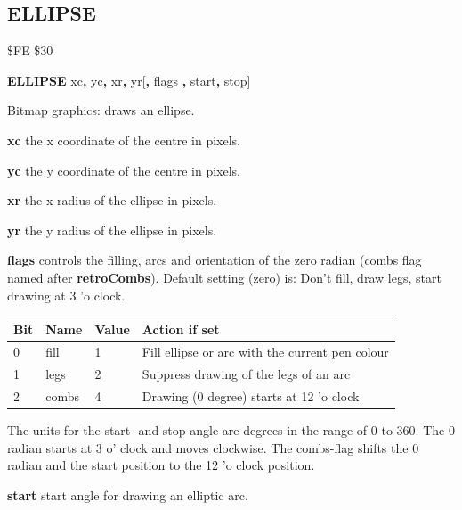 \subsection{ELLIPSE}
\begin{description}[leftmargin=2cm,style=nextline]
\item [Token:]    \$FE \$30

\item [Format:]   {\bf ELLIPSE} xc{\bf,} yc{\bf,} xr{\bf,} yr[{\bf,} flags {\bf,} start{\bf,} stop]

\item [Usage:]    Bitmap graphics: draws an ellipse.

                  {\bf xc} the x coordinate of the centre in pixels.

                  {\bf yc} the y coordinate of the centre in pixels.

                  {\bf xr} the x radius of the ellipse in pixels.

                  {\bf yr} the y radius of the ellipse in pixels.

                  {\bf flags} controls the filling, arcs and orientation of the zero radian (combs flag named after {\bf retroCombs}). Default setting (zero) is: Don't fill, draw legs, start drawing at 3 'o clock.

                  {\setlength{\tabcolsep}{1.5mm}
                  \begin{tabular}{|l|l|l|l|}
                  \hline
                  {\bf Bit}  & {\bf Name} & {\bf Value} & {\bf Action if set} \\
                  \hline
                  0 & fill  & 1  & Fill ellipse or arc with the current pen colour \\
                  1 & legs  & 2  & Suppress drawing of the legs of an arc \\
                  2 & combs & 4  & Drawing (0 degree) starts at 12 'o clock \\
                  \hline
                  \end{tabular}
                  }

                  The units for the start- and stop-angle are degrees in the range of 0 to 360. The 0 radian starts at 3 o' clock and moves clockwise. The combs-flag shifts the 0 radian and the start position to the 12 'o clock position.

                  {\bf start} start angle for drawing an elliptic arc.


\end{description}

